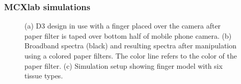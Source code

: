         \subsubsection{MCXlab simulations}
        \begin{figure}
            \begin{center}
            \end{center}
            \caption{(a) D3 design in use with a finger placed over the camera after paper filter is taped over bottom half of mobile phone camera. (b) Broadband spectra (black) and resulting spectra after manipulation using a colored paper filters. The color line refers to the color of the paper filter. (c) Simulation setup showing finger model with six tissue types.} 
            \label{fig:D3simulations}
        \end{figure} 
